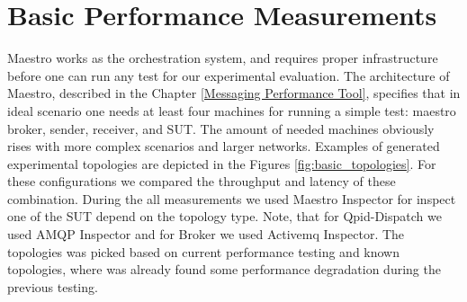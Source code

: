 \section{Basic Performance Measurements}
\label{Basic Performance Measurements}
Maestro works as the orchestration system, and requires proper infrastructure before one can run any test for our experimental evaluation. The architecture of Maestro, described in the Chapter \ref{Messaging Performance Tool}, specifies that in ideal scenario one needs at least four machines for running a simple test: maestro broker, sender, receiver, and SUT. The amount of needed machines obviously rises with more complex scenarios and larger networks. Examples of generated experimental topologies are depicted in the Figures \ref{fig:basic_topologies}. For these configurations we compared the throughput and latency of these combination. During the all measurements we used Maestro Inspector for inspect one of the SUT depend on the topology type. Note, that for Qpid-Dispatch we used AMQP Inspector and for Broker we used Activemq Inspector. The topologies was picked based on current performance testing and known topologies, where was already found some performance degradation during the previous testing.

